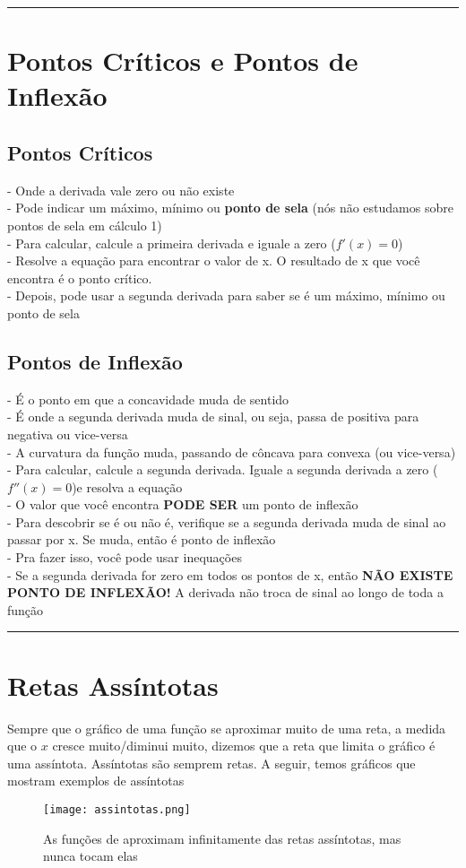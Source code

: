 \documentclass{article}
\begin{document}
\vspace{15pt}
\hrule

\section{Pontos Críticos e Pontos de Inflexão}

\subsection{Pontos Críticos}
- Onde a derivada vale zero ou não existe\\
- Pode indicar um máximo, mínimo ou \textbf{ponto de sela} (nós não estudamos sobre pontos de sela em cálculo 1)\\
- Para calcular, calcule a primeira derivada  e iguale a zero ($f'(x) = 0$)\\
- Resolve a equação para encontrar o valor de x. O resultado de x que você encontra é o ponto crítico.\\
- Depois, pode usar a segunda derivada para saber se é um máximo, mínimo ou ponto de sela

\subsection{Pontos de Inflexão}
- É o ponto em que a concavidade muda de sentido\\
- É onde a segunda derivada muda de sinal, ou seja, passa de positiva para negativa ou vice-versa\\
- A curvatura da função muda, passando de côncava para convexa (ou vice-versa)\\
- Para calcular, calcule a segunda derivada. Iguale a segunda derivada a zero ($f''(x) = 0$)e resolva a equação\\
- O valor que você encontra \textbf{PODE SER} um ponto de inflexão\\
- Para descobrir se é ou não é, verifique se a segunda derivada muda de sinal ao passar por x. Se muda, então é ponto de inflexão\\
- Pra fazer isso, você pode usar inequações\\
- Se a segunda derivada for zero em todos os pontos de x, então \textbf{NÃO EXISTE PONTO DE INFLEXÃO!} A derivada não troca de sinal ao longo de toda a função
\vspace{15pt}
\hrule

\section{Retas Assíntotas}
Sempre que o gráfico de uma função se aproximar muito de uma reta, a medida que o $x$ cresce muito/diminui muito, dizemos que a reta que limita o gráfico é uma assíntota. Assíntotas são semprem retas. A seguir, temos gráficos que mostram exemplos de assíntotas
\begin{figure}[h]
    \centering
    \texttt{[image: assintotas.png]}
    \caption{As funções de aproximam infinitamente das retas assíntotas, mas nunca tocam elas}
\end{figure}
\end{document}
